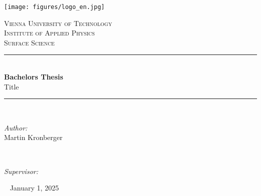 \thispagestyle{empty}

\newcommand{\HRule}{\rule{\linewidth}{0.5mm}} %

\texttt{[image: figures/logo\_en.jpg]}
\vspace{3cm}

\begin{center} %

\textsc{\LARGE Vienna University of Technology}\\[1cm] 
\textsc{\Large Institute of Applied Physics}\\[1cm]
\textsc{\large Surface Science}\\[3cm]

\HRule \\[0.4cm]
{\Huge \bfseries Bachelors Thesis}\\[0.5cm] %
{\Large Title}
\HRule \\[2cm]


\begin{minipage}{0.4\textwidth}
\begin{flushleft} \large
	\emph{Author:}\\
	Martin Kronberger\\
	\end{flushleft}
	\end{minipage}
~
\begin{minipage}{0.5\textwidth}
\begin{flushright} \large
	\emph{Supervisor:} \\
\end{flushright}
\end{minipage}\
\vspace{1cm}
\makeatletter
\vspace{1cm}
{\large January 1, 2025}
\end{center}

\blankpage

